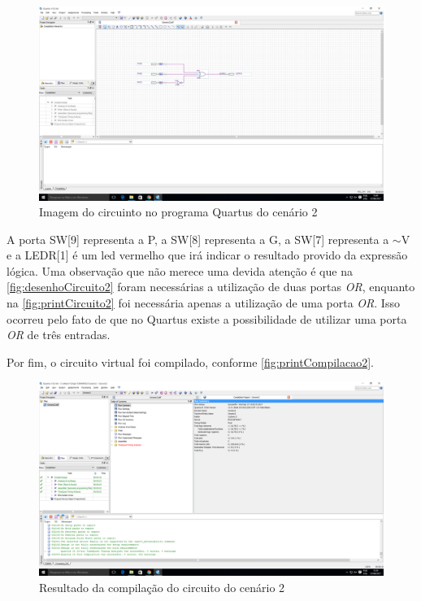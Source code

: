 	\begin{figure}[H]
	    \centering
		\caption{\label{fig:printCircuito2}Imagem do circuinto no programa Quartus do cenário 2}
		\includegraphics[width=1\textwidth]{img/cenario2/printCircuito}
	\end{figure}

	A porta SW[9] representa a P, a SW[8] representa a G, a SW[7]
	 representa a $\sim$V e a LEDR[1] é um led vermelho que irá
	 indicar o resultado provido da expressão lógica. Uma observação que não merece uma devida atenção é que
	 na \autoref{fig:desenhoCircuito2} foram necessárias a utilização de duas portas \textit{OR}, enquanto na
	 \autoref{fig:printCircuito2} foi necessária apenas a utilização de uma porta \textit{OR}. Isso ocorreu pelo fato
	 de que no Quartus existe a possibilidade de utilizar uma porta \textit{OR} de três entradas.

	Por fim, o circuito virtual foi compilado, conforme \autoref{fig:printCompilacao2}.

	\begin{figure}[H]
	    \centering
		\caption{\label{fig:printCompilacao2}Resultado da compilação do circuito do cenário 2}
		\includegraphics[width=1\textwidth]{img/cenario2/printCompilacao}
	\end{figure}


